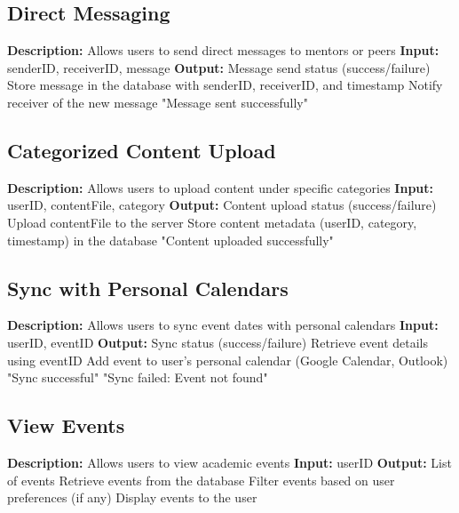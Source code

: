 \subsection{Direct Messaging}
\begin{algorithmic}[1]
\State \textbf{Description:} Allows users to send direct messages to mentors or peers
\State
\State \textbf{Input:} senderID, receiverID, message
\State \textbf{Output:} Message send status (success/failure)
\State
\State Store message in the database with senderID, receiverID, and timestamp
\State Notify receiver of the new message
\State \Return "Message sent successfully"
\end{algorithmic}

\subsection{Categorized Content Upload}
\begin{algorithmic}[1]
\State \textbf{Description:} Allows users to upload content under specific categories
\State
\State \textbf{Input:} userID, contentFile, category
\State \textbf{Output:} Content upload status (success/failure)
\State
\State Upload contentFile to the server
\State Store content metadata (userID, category, timestamp) in the database
\State \Return "Content uploaded successfully"
\end{algorithmic}

\subsection{Sync with Personal Calendars}
\begin{algorithmic}[1]
\State \textbf{Description:} Allows users to sync event dates with personal calendars
\State
\State \textbf{Input:} userID, eventID
\State \textbf{Output:} Sync status (success/failure)
\State
\State Retrieve event details using eventID
    \State Add event to user's personal calendar (Google Calendar, Outlook)
    \State \Return "Sync successful"
\Else
    \State \Return "Sync failed: Event not found"
\EndIf
\end{algorithmic}

\subsection{View Events}
\begin{algorithmic}[1]
\State \textbf{Description:} Allows users to view academic events
\State
\State \textbf{Input:} userID
\State \textbf{Output:} List of events
\State
\State Retrieve events from the database
\State Filter events based on user preferences (if any)
\State Display events to the user
\end{algorithmic}

